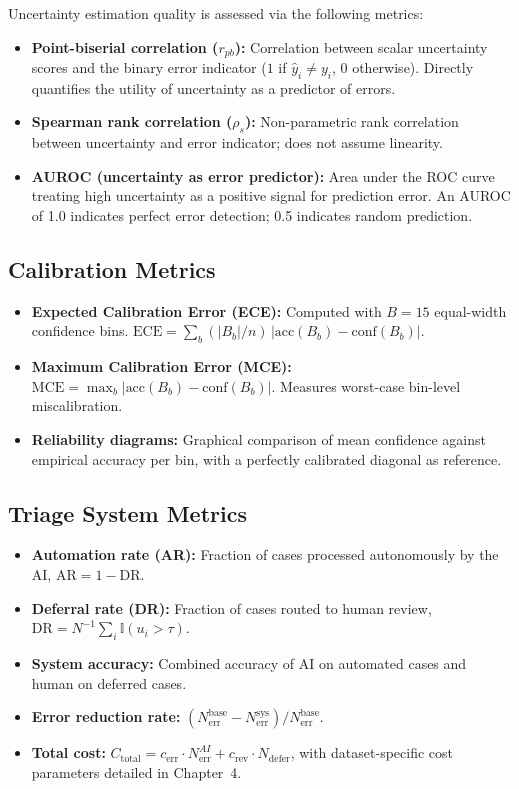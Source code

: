 Uncertainty estimation quality is assessed via the following metrics:

\begin{itemize}
    \item \textbf{Point-biserial correlation ($r_{pb}$):} Correlation between scalar uncertainty scores and the binary error indicator ($1$ if $\hat{y}_i \neq y_i$, $0$ otherwise). Directly quantifies the utility of uncertainty as a predictor of errors.
    \item \textbf{Spearman rank correlation ($\rho_s$):} Non-parametric rank correlation between uncertainty and error indicator; does not assume linearity.
    \item \textbf{AUROC (uncertainty as error predictor):} Area under the ROC curve treating high uncertainty as a positive signal for prediction error. An AUROC of 1.0 indicates perfect error detection; 0.5 indicates random prediction.
\end{itemize}

\subsection{Calibration Metrics}

\begin{itemize}
    \item \textbf{Expected Calibration Error (ECE):} Computed with $B=15$ equal-width confidence bins. $\text{ECE} = \sum_b (|B_b|/n)\,|\text{acc}(B_b) - \text{conf}(B_b)|$.
    \item \textbf{Maximum Calibration Error (MCE):} $\text{MCE} = \max_b |\text{acc}(B_b) - \text{conf}(B_b)|$. Measures worst-case bin-level miscalibration.
    \item \textbf{Reliability diagrams:} Graphical comparison of mean confidence against empirical accuracy per bin, with a perfectly calibrated diagonal as reference.
\end{itemize}

\subsection{Triage System Metrics}

\begin{itemize}
    \item \textbf{Automation rate (AR):} Fraction of cases processed autonomously by the AI, $\text{AR} = 1 - \text{DR}$.
    \item \textbf{Deferral rate (DR):} Fraction of cases routed to human review, $\text{DR} = N^{-1}\sum_i \mathbb{I}(u_i > \tau)$.
    \item \textbf{System accuracy:} Combined accuracy of AI on automated cases and human on deferred cases.
    \item \textbf{Error reduction rate:} $(N_{\text{err}}^{\text{base}} - N_{\text{err}}^{\text{sys}}) / N_{\text{err}}^{\text{base}}$.
    \item \textbf{Total cost:} $C_{\text{total}} = c_{\text{err}} \cdot N_{\text{err}}^{AI} + c_{\text{rev}} \cdot N_{\text{defer}}$, with dataset-specific cost parameters detailed in Chapter~4.
\end{itemize}

